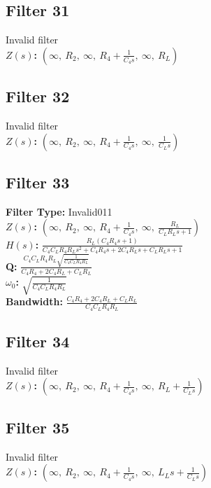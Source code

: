 \documentclass{article}
\begin{document}
\subsection*{Filter 31}
Invalid filter \\ 
\textbf{$Z(s)$:} $\left( \infty, \  R_{2}, \  \infty, \  R_{4} + \frac{1}{C_{4} s}, \  \infty, \  R_{L}\right)$ \\ 
\subsection*{Filter 32}
Invalid filter \\ 
\textbf{$Z(s)$:} $\left( \infty, \  R_{2}, \  \infty, \  R_{4} + \frac{1}{C_{4} s}, \  \infty, \  \frac{1}{C_{L} s}\right)$ \\ 
\subsection*{Filter 33}
\textbf{Filter Type:} Invalid011 \\ 
\textbf{$Z(s)$:} $\left( \infty, \  R_{2}, \  \infty, \  R_{4} + \frac{1}{C_{4} s}, \  \infty, \  \frac{R_{L}}{C_{L} R_{L} s + 1}\right)$ \\ 
\textbf{$H(s)$:} $\frac{R_{L} \left(C_{4} R_{4} s + 1\right)}{C_{4} C_{L} R_{4} R_{L} s^{2} + C_{4} R_{4} s + 2 C_{4} R_{L} s + C_{L} R_{L} s + 1}$ \\ 
\textbf{Q:} $\frac{C_{4} C_{L} R_{4} R_{L} \sqrt{\frac{1}{C_{4} C_{L} R_{4} R_{L}}}}{C_{4} R_{4} + 2 C_{4} R_{L} + C_{L} R_{L}}$ \\ 
\textbf{$\omega_0$:} $\sqrt{\frac{1}{C_{4} C_{L} R_{4} R_{L}}}$ \\ 
\textbf{Bandwidth:} $\frac{C_{4} R_{4} + 2 C_{4} R_{L} + C_{L} R_{L}}{C_{4} C_{L} R_{4} R_{L}}$ \\ 
\subsection*{Filter 34}
Invalid filter \\ 
\textbf{$Z(s)$:} $\left( \infty, \  R_{2}, \  \infty, \  R_{4} + \frac{1}{C_{4} s}, \  \infty, \  R_{L} + \frac{1}{C_{L} s}\right)$ \\ 
\subsection*{Filter 35}
Invalid filter \\ 
\textbf{$Z(s)$:} $\left( \infty, \  R_{2}, \  \infty, \  R_{4} + \frac{1}{C_{4} s}, \  \infty, \  L_{L} s + \frac{1}{C_{L} s}\right)$ \\ 
\end{document}
